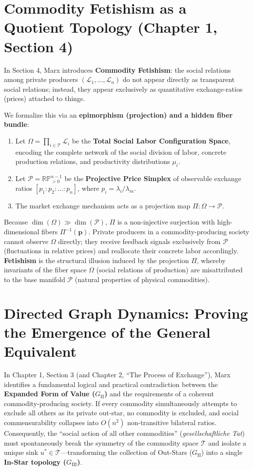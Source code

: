 \documentclass[11pt,a4paper]{article}
\begin{document}
\section{Commodity Fetishism as a Quotient Topology (Chapter 1, Section 4)}

In Section 4, Marx introduces \textbf{Commodity Fetishism}: the social relations among private producers $(\mathcal{L}_1, \dots, \mathcal{L}_n)$ do not appear directly as transparent social relations; instead, they appear exclusively as quantitative exchange-ratios (prices) attached to things.

We formalize this via an \textbf{epimorphism (projection) and a hidden fiber bundle}:
\begin{enumerate}
    \item Let $\Omega = \prod_{i \in \mathcal{T}} \mathcal{L}_i$ be the \textbf{Total Social Labor Configuration Space}, encoding the complete network of the social division of labor, concrete production relations, and productivity distributions $\mu_i$.
    \item Let $\mathcal{P} = \mathbb{RP}^{n-1}_{>0}$ be the \textbf{Projective Price Simplex} of observable exchange ratios $[p_1 : p_2 : \dots : p_n]$, where $p_i = \lambda_i / \lambda_m$.
    \item The market exchange mechanism acts as a projection map $\Pi: \Omega \to \mathcal{P}$.
\end{enumerate}

Because $\dim(\Omega) \gg \dim(\mathcal{P})$, $\Pi$ is a non-injective surjection with high-dimensional fibers $\Pi^{-1}(\mathbf{p})$. Private producers in a commodity-producing society cannot observe $\Omega$ directly; they receive feedback signals exclusively from $\mathcal{P}$ (fluctuations in relative prices) and reallocate their concrete labor accordingly. \textbf{Fetishism} is the structural illusion induced by the projection $\Pi$, whereby invariants of the fiber space $\Omega$ (social relations of production) are misattributed to the base manifold $\mathcal{P}$ (natural properties of physical commodities).

\section{Directed Graph Dynamics: Proving the Emergence of the General Equivalent}

In Chapter 1, Section 3 (and Chapter 2, ``The Process of Exchange''), Marx identifies a fundamental logical and practical contradiction between the \textbf{Expanded Form of Value ($G_{\text{II}}$)} and the requirements of a coherent commodity-producing society. If every commodity simultaneously attempts to exclude all others as its private out-star, no commodity is excluded, and social commensurability collapses into $O(n^2)$ non-transitive bilateral ratios. Consequently, the ``social action of all other commodities'' (\textit{gesellschaftliche Tat}) must spontaneously break the symmetry of the commodity space $\mathcal{T}$ and isolate a unique sink $u^* \in \mathcal{T}$---transforming the collection of Out-Stars ($G_{\text{II}}$) into a single \textbf{In-Star topology ($G_{\text{III}}$)}.
\end{document}
